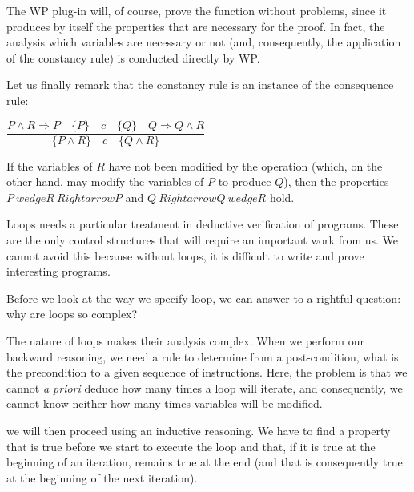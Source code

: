 \documentclass[middle]{zmdocument}
\begin{document}
The WP plug-in will, of course, prove the function without problems,
since it produces by itself the properties that are necessary for the
proof. In fact, the analysis which variables are necessary or not (and,
consequently, the application of the constancy rule) is conducted
directly by WP.

Let us finally remark that the constancy rule is an instance of the
consequence rule:




\begin{center}
$\dfrac{P \wedge R \Rightarrow P \quad \{P\}\quad c\quad \{Q\} \quad Q \Rightarrow Q \wedge R}{\{P \wedge R\}\quad c\quad \{Q \wedge R\}}$


\end{center}


If the variables of $R$ have not been modified by the operation
(which, on the other hand, may modify the variables of $P$ to produce
$Q$), then the properties $P \ wedge R \ Rightarrow P$ and
$Q \ Rightarrow Q \ wedge R$ hold.





Loops needs a particular treatment in deductive verification of
programs. These are the only control structures that will require an
important work from us. We cannot avoid this because without loops, it
is difficult to write and prove interesting programs.



Before we look at the way we specify loop, we can answer to a rightful
question: why are loops so complex?





The nature of loops makes their analysis complex. When we perform our
backward reasoning, we need a rule to determine from a post-condition,
what is the precondition to a given sequence of instructions. Here, the
problem is that we cannot \emph{a priori} deduce how many times a loop
will iterate, and consequently, we cannot know neither how many times
variables will be modified.



we will then proceed using an inductive reasoning. We have to find a
property that is true before we start to execute the loop and that, if
it is true at the beginning of an iteration, remains true at the end
(and that is consequently true at the beginning of the next iteration).
\end{document}
